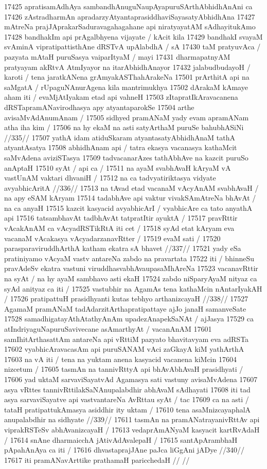 17425 apratisamAdhAya sambandhAnuguNaupAyapuruSArthAbhidhAnAni ca  
17426 zAstradharmAn apradarzyAtyantaprasiddhaviSayasatyAbhidhAna 
17427 mAtreNa prajJAprakarSaduravagahagahane api niratyayatAM sAdhayitukAmo
17428 bandhakIm api prAgalbhyena vijayate / kAcit kila  
17429 bandhakI svayaM svAminA vipratipattisthAne dRSTvA upAlabdhA / sA 
17430 taM pratyuvAca / pazyata mAtaH puruSasya vaiparItyaM / mayi
17431 dharmapatnyAM pratyayam akRtvA AtmIyayor na itarAbhidhAnayor
17432 jalabudbudayoH / karoti / tena jaratkANena grAmyakASThahArakeNa
17501 prArthitA api na saMgatA / rUpaguNAnurAgena kila mantrimukhya
17502 dArakaM kAmaye aham iti / evaMjAtIyakam etad api vahneH
17503 zItapratIkAravacanena dRSTapramANavirodhasya apy atyantaparokSe
17504 arthe avisaMvAdAnumAnam /
17505 	sidhyed pramANaM yady evam apramANam atha iha kim / 
17506 	na hy ekaM na asti satyArthaM puruSe bahubhASiNi //335//
17507 yathA idam atiduSkaram atyantasatyAbhidhAnaM tathA atyantAsatya  
17508 abhidhAnam api / tatra ekasya vacanasya kathaMcit saMvAdena  aviziSTasya
17509 tadvacanarAzes tathAbhAve na kazcit puruSo anAptaH
17510 syAt / api ca / 
17511 	na ayaM svabhAvaH kAryaM vA vastUnAM vaktari dhvaniH / 
17512 	na ca tadvyatiriktasya vidyate avyabhicAritA //336//  
17513 na tAvad etad vacanaM vAcyAnAM svabhAvaH / na apy eSAM kAryam
17514 tadabhAve api vaktur vivakSAmAtreNa bhAvAt / na ca anyaH  
17515 kazcit kasyacid avyabhicArI / vyabhicAre ca tato anyathA api 
17516 tatsambhavAt tadbhAvAt tatpratItir ayuktA /  
17517 	pravRttir vAcakAnAM ca vAcyadRSTikRtA iti cet /
17518 syAd etat kAryam eva vacanaM vAcakasya vAcyadarzanavRtter /
17519 evaM sati /
17520 	parasparaviruddhArthA katham ekatra sA bhavet //337//  
17521 yady eSa pratiniyamo vAcyaM vastv antareNa zabdo na pravartata  
17522 iti / bhinneSu pravAdeSv ekatra vastuni viruddhasvabhAvaupasaMhAreNa 
17523 vacanavRttir na syAt / na hy ayaM sambhavo asti ekaH  
17524 zabdo niSparyAyaM nityaz ca syAd anityaz ca iti /  
17525 	vastubhir na AgamAs tena kathaMcin nAntarIyakAH /  
17526 	pratipattuH prasidhyanti kutas tebhyo arthanizcayaH //338//
17527 AgamaM pramANaM tadAdarzitArthapratipattaye ajJo janaH samanveSate 
17528 samadhigatayAthAtathyAnAm upadezAnapekSaNAt / ajJasya 
17529 ca atIndriyaguNapuruSavivecane asAmarthyAt / vacanAnAM
17601 samIhitArthasattAm antareNa api vRttiM pazyato bhavitavyam eva adRSTa
17602 vyabhicAravacasAm api puruSANAM vAci zaGkayA kiM yathArthA 
17603 na vA iti / tena na yuktam anena kasyacid vacanena kiMcin 
17604 nizcetum / 
17605 	tasmAn na tannivRttyA api bhAvAbhAvaH prasidhyati /  
17606 yad uktaM sarvaviSayatvAd Agamasya sati vastuny avisaMvAdena 
17607 asya vRttes tannivRttilakSaNAnupalabdhir abhAvaM sAdhayati 
17608 iti tad asya sarvaviSayatve api vastvantareNa AvRttau syAt / tac
17609 ca na asti / tataH pratipattukAmasya asiddhir ity uktam / 
17610 	tena asaMnizcayaphalA anupalabdhir na sidhyate //339// 
17611 tasmAn na pramANatrayanivRttAv api viprakRSTeSv abhAvanizcayaH /
17613 	vedaprAmANyaM kasyacit kartRvAdaH / 
17614 	snAne dharmaicchA jAtivAdAvalepaH /  
17615 	santApArambhaH pApahAnAya ca iti /  
17616 	dhvastaprajJAne paJca liGgAni jADye //340//  
17617 iti pramANavArttike prathamaH paricchedaH // //  
